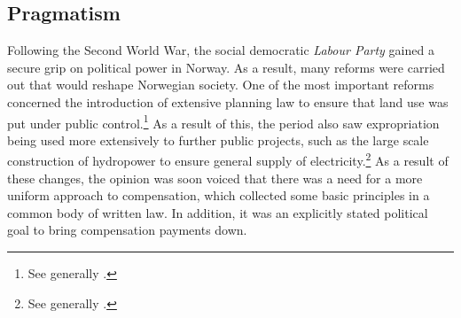 {%
%

\subsection{Pragmatism}\label{sec:prag}

Following the Second World War, the social democratic \emph{Labour Party} gained a secure grip on political power in Norway. As a result, many reforms were carried out that would reshape Norwegian society. One of the most important reforms concerned the introduction of extensive planning law to ensure that land use was put under public control.\footnote{See generally \cite{thomassen97,kleven11}.} As a result of this, the period also saw expropriation being used more extensively to further public projects, such as the large scale construction of hydropower to ensure general supply of electricity.\footnote{See generally \cite{skjold06,thue06b}.} As a result of these changes, the opinion was soon voiced that there was a need for a more uniform approach to compensation, which collected some basic principles in a common body of written law. In addition, it was an explicitly stated political goal to bring compensation payments down.

}
